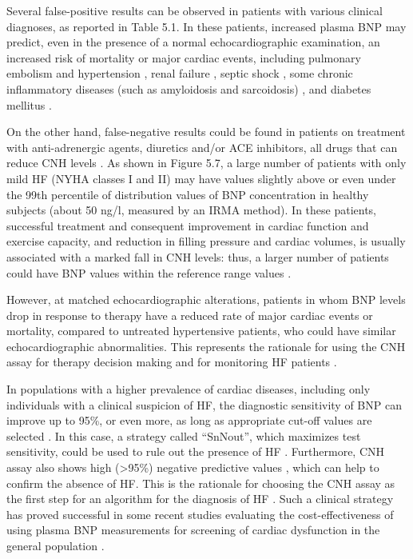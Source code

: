 \documentclass[14pt,a4paper,onecolumn]{extarticle}
\begin{document}
Several false-positive results can be observed in patients with various clinical diagnoses, as reported in Table 5.1. In these patients, increased plasma BNP may predict,
even in the presence of a normal echocardiographic examination, an increased risk of
mortality or major cardiac events, including pulmonary embolism \citep{bib380} \citep{bib381} \citep{bib382} and hypertension \citep{bib383}, renal failure \citep{bib384} \citep{bib385}, septic shock \citep{bib386}, some chronic inflammatory diseases
(such as amyloidosis and sarcoidosis) \citep{bib387} \citep{bib388}, and diabetes mellitus \citep{bib389}.

On the other hand, false-negative results could be found in patients on treatment
with anti-adrenergic agents, diuretics and/or ACE inhibitors, all drugs that can reduce
CNH levels \citep{bib35}. As shown in Figure 5.7, a large number of patients with only mild HF
(NYHA classes I and II) may have values slightly above or even under the 99th percentile of distribution values of BNP concentration in healthy subjects (about 50 ng/l,
measured by an IRMA method). In these patients, successful treatment and consequent
improvement in cardiac function and exercise capacity, and reduction in filling pressure
and cardiac volumes, is usually associated with a marked fall in CNH levels: thus, a larger number of patients could have BNP values within the reference range values \citep{bib35} \citep{bib390}.

However, at matched echocardiographic alterations, patients in whom BNP levels drop
in response to therapy have a reduced rate of major cardiac events or mortality, compared to untreated hypertensive patients, who could have similar echocardiographic
abnormalities. This represents the rationale for using the CNH assay for therapy decision making and for monitoring HF patients \citep{bib35} \citep{bib361} \citep{bib362} \citep{bib363} \citep{bib364} \citep{bib365}.

In populations with a higher prevalence of cardiac diseases, including only individuals with a clinical suspicion of HF, the diagnostic sensitivity of BNP can improve up to
95\%, or even more, as long as appropriate cut-off values are selected \citep{bib35} \citep{bib372}. In this case,
a strategy called “SnNout”, which maximizes test sensitivity, could be used to rule out
the presence of HF \citep{bib391}. Furthermore, CNH assay also shows high (>95\%) negative predictive values \citep{bib35} \citep{bib320}, which can help to confirm the absence of HF. This is the rationale for choosing the CNH assay as the first step for an algorithm for the diagnosis of HF
\citep{bib369} \citep{bib370}. Such a clinical strategy has proved successful in some recent studies evaluating the cost-effectiveness of using plasma BNP measurements for screening of cardiac
dysfunction in the general population \citep{bib392} \citep{bib393} \citep{bib394}.
\end{document}
